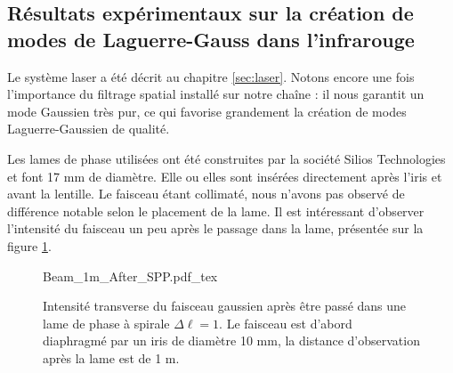 \subsection{Résultats expérimentaux sur la création de modes de Laguerre-Gauss dans l'infrarouge}
\label{sec:spp}
Le système laser a été décrit au chapitre \ref{sec:laser}. Notons encore une fois l'importance du filtrage spatial installé sur notre chaîne : il nous garantit un mode Gaussien très pur, ce qui favorise grandement la création de modes Laguerre-Gaussien de qualité. \par
Les lames de phase utilisées ont été construites par la société Silios Technologies et font 17 mm de diamètre. Elle ou elles sont insérées directement après l'iris et avant la lentille. Le faisceau étant collimaté, nous n'avons pas observé de différence notable selon le placement de la lame. Il est intéressant d'observer l'intensité du faisceau un peu après le passage dans la lame, présentée sur la figure \ref{Fig:BeamAfterSPP}.

\begin{figure}[!ht]
\centering
\def\svgwidth{0.4\columnwidth}
{Beam_1m_After_SPP.pdf_tex}
\caption{Intensité transverse du faisceau gaussien après être passé dans une lame de phase à spirale $\Delta\ell = 1$. Le faisceau est d'abord diaphragmé par un iris de diamètre 10 mm, la distance d'observation après la lame est de 1 m.}
\label{Fig:BeamAfterSPP}
\end{figure}


